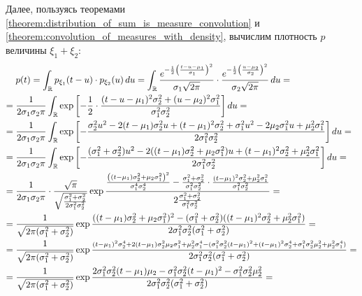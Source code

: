 \documentclass[../main.tex]{subfiles}
\begin{document}
\begin{exmpl}
 Далее, пользуясь теоремами \ref{theorem:distribution_of_sum_is_measure_convolution} и \ref{theorem:convolution_of_measures_with_density}, вычислим плотность $ p $ величины $ \xi_1+\xi_2 $:
 \begin{align*}
  &p(t) = \int_{\R} p_{\xi_1}(t-u)\cdot p_{\xi_2}(u)\,du = \int_{\R}  \frac{e^{-\frac{1}{2} \left( \frac{t-u-\mu_1}{\sigma_1} \right)^{2}}}{\sigma_1\sqrt{2\pi}} \cdot \frac{e^{-\frac{1}{2} \left( \frac{u-\mu_2}{\sigma_2} \right)^{2}}}{\sigma_2\sqrt{2\pi}}\,du = \\
  =\;& \frac{1}{2\sigma_1 \sigma_2 \pi} \int_{\R} \exp \left[ -\frac{1}{2} \cdot \frac{(t-u-\mu_1)^{2}\sigma_2^{2} + (u-\mu_2)^{2}\sigma_1^{2}}{\sigma_1^{2}\sigma_2^{2}} \right] du = \\
  =\;& \frac{1}{2\sigma_1 \sigma_2 \pi} \int_{\R} \exp \left[ -\frac{\sigma_2^{2}u^{2} - 2(t-\mu_1)\sigma_2^{2}u + (t-\mu_1)^{2}\sigma_2^{2} + \sigma_1^{2}u^{2} - 2\mu_2 \sigma_1^{2}u + \mu_2^{2}\sigma_1^{2}}{2\sigma_1^{2}\sigma_2^{2}} \right]du = \\
  =\;& \frac{1}{2\sigma_1 \sigma_2 \pi} \int_{\R} \exp \left[ -\frac{(\sigma_1^{2}+\sigma_2^{2})u^{2} -2((t - \mu_1)\sigma_2^{2} + \mu_2 \sigma_1^{2})u + (t-\mu_1)^{2}\sigma_2^{2} + \mu_2^{2} \sigma_1^{2}}{2\sigma_1^{2}\sigma_2^{2}} \right] du = \\
  =\;&\frac{1}{2\sigma_1\sigma_2\pi} \cdot \frac{\sqrt \pi}{\sqrt {\frac{\sigma_1^{2}+\sigma_2^{2}}{2\sigma_1^{2}\sigma_2^{2}}}}\exp \frac{ \frac{\left( (t-\mu_1)\sigma_2^{2} + \mu_2 \sigma_1^{2} \right)^{2}}{\sigma_1^{4}\sigma_2^{4}} - \frac{\sigma_1^{2}+\sigma_2^{2}}{\sigma_1^{2}\sigma_2^{2}} \cdot \frac{(t-\mu_1)^{2}\sigma_2^{2} + \mu_2^{2}\sigma_1^{2}}{\sigma_1^{2}\sigma_2^{2}}}{2 \frac{\sigma_1^{2}+\sigma_2^{2}}{\sigma_1^{2}\sigma_2^{2}}} = \\
  =\;&\frac{1}{\sqrt{2\pi (\sigma_1^{2}+\sigma_2^{2})}}\exp \frac{((t-\mu_1)\sigma_2^{2} + \mu_2\sigma_1^{2})^{2} - (\sigma_1^{2}+\sigma_2^{2})((t-\mu_1)^{2}\sigma_2^{2} + \mu_2^{2}\sigma_1^{2})}{2\sigma_1^{2}\sigma_2^{2}(\sigma_1^{2}+\sigma_2^{2})} = \\
  =\;&\frac{1}{\sqrt{2\pi (\sigma_1^{2}+\sigma_2^{2})}} \exp \frac{\scriptstyle{(t-\mu_1)^{2}\sigma_2^{4} + 2(t-\mu_1)\sigma_2^{2}\mu_2\sigma_1^{2} + \mu_2^{2}\sigma_1^{4}-(\sigma_1^{2}\sigma_2^{2}(t-\mu_1)^{2} + (t-\mu_1)^{2}\sigma_2^{4} + \sigma_1^{2}\sigma_2^{2}\mu_2^{2} + \mu_2^{2}\sigma_1^{4})}}{2\sigma_1^{2}\sigma_2^{2}(\sigma_1^{2}+\sigma_2^{2})} = \\
  =\;&\frac{1}{\sqrt{2\pi (\sigma_1^{2}+\sigma_2^{2})}} \exp \frac{2\sigma_1^{2}\sigma_2^{2}(t-\mu_1)\mu_2 - \sigma_1^{2}\sigma_2^{2}(t-\mu_1)^{2} - \sigma_1^{2}\sigma_2^{2}\mu_2^{2}}{2\sigma_1^{2}\sigma_2^{2}(\sigma_1^{2}+\sigma_2^{2})} = \\

\end{align*}
\end{exmpl}
\end{document}
